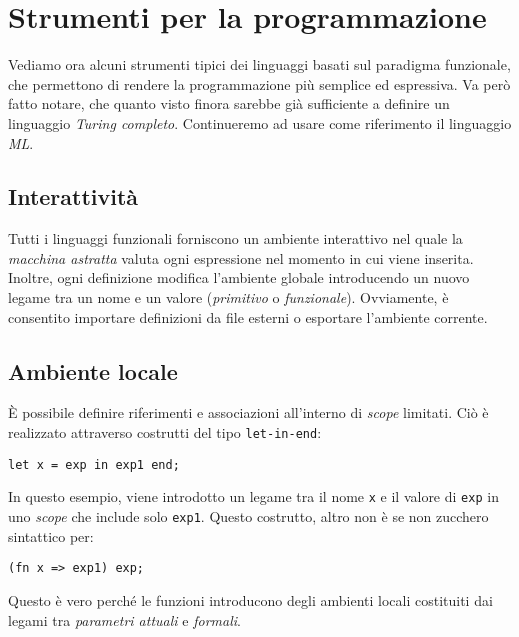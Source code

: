 \documentclass[12pt, a4paper]{report}
\theoremstyle{definition}
\newcommand{\code}[1]{\texttt{#1}}
\begin{document}
\chapter{Strumenti per la programmazione}
Vediamo ora alcuni strumenti tipici dei linguaggi basati sul paradigma funzionale,
che permettono di rendere la programmazione più semplice ed espressiva. Va però
fatto notare, che quanto visto finora sarebbe già sufficiente a definire un
linguaggio \emph{Turing completo}. Continueremo ad usare come riferimento il
linguaggio \emph{ML}.

\section{Interattività}
Tutti i linguaggi funzionali forniscono un ambiente interattivo nel quale la
\emph{macchina astratta} valuta ogni espressione nel momento in cui viene inserita.
Inoltre, ogni definizione modifica l'ambiente globale introducendo un nuovo legame
tra un nome e un valore (\emph{primitivo} o \emph{funzionale}). Ovviamente, è
consentito importare definizioni da file esterni o esportare l'ambiente corrente.

\section{Ambiente locale}
È possibile definire riferimenti e associazioni all'interno di \emph{scope}
limitati. Ciò è realizzato attraverso costrutti del tipo \code{let-in-end}:
\begin{lstlisting}
let x = exp in exp1 end;
\end{lstlisting}
In questo esempio, viene introdotto un legame tra il nome \code{x} e il valore
di \code{exp} in uno \emph{scope} che include solo \code{exp1}.
Questo costrutto, altro non è se non zucchero sintattico per:
\begin{lstlisting}
(fn x => exp1) exp;
\end{lstlisting}
Questo è vero perché le funzioni introducono degli ambienti locali costituiti
dai legami tra \emph{parametri attuali} e \emph{formali}.
\end{document}
